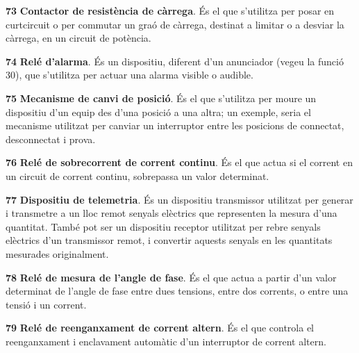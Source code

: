 \begin{multicols}{2}
\begin{list}{}
\item[\textbf{73}]   
\textbf{Contactor de resistència  de càrrega}. És el que s'utilitza per posar en curtcircuit o per commutar un graó de càrrega,
 destinat a limitar o a desviar la càrrega, en un circuit de potència.

\item[\textbf{74}]  
 \textbf{Relé d'alarma}. És un dispositiu,
diferent d'un anunciador (vegeu la funció 30), que s'utilitza per actuar una alarma
visible o audible.

\item[\textbf{75}]  
 \textbf{Mecanisme de canvi de posició}. És el que s'utilitza per moure un dispositiu d'un equip
des d'una posició a una altra; un  exemple, seria el mecanisme
utilitzat per canviar un interruptor entre les posicions de
connectat, desconnectat i prova.

\item[\textbf{76}]   
\textbf{Relé de sobrecorrent de corrent continu}. És el que actua si el corrent en un circuit de
corrent continu, sobrepassa un valor determinat.

\item[\textbf{77}]   
\textbf{Dispositiu de telemetria}. És un
 dispositiu transmissor utilitzat per generar i transmetre  a un lloc remot senyals elèctrics que representen la mesura d'una quantitat. També pot ser un dispositiu receptor utilitzat per rebre senyals elèctrics d'un transmissor remot, i convertir aquests senyals en les quantitats mesurades originalment.

\item[\textbf{78}]   
\textbf{Relé de  mesura de l'angle de fase}. És el que actua a partir d'un valor determinat de
l'angle de fase entre dues tensions, entre dos corrents, o entre una
tensió i un corrent.

\item[\textbf{79}]   
\textbf{Relé de reenganxament de corrent altern}. És el que controla el reenganxament i enclavament automàtic d'un
interruptor de corrent altern.


\end{list}
\end{multicols}
